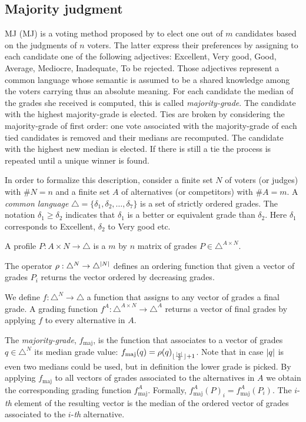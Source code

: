 \subsection*{Majority judgment}
	\label{sec:MJ}
	\acrlong{MJ} (\ac{MJ}) is a voting method proposed by \citet{Balinski2007,Balinski2011} to elect one out of $m$ candidates based on the judgments of $n$ voters. The latter express their preferences by assigning to each candidate one of the following adjectives: Excellent, Very good, Good, Average, Mediocre, Inadequate, To be rejected. Those adjectives represent a common language whose semantic is assumed to be a shared knowledge among the voters carrying thus an absolute meaning. For each candidate the median of the grades she received is computed, this is called \textit{majority-grade}. The candidate with the highest majority-grade is elected. Ties are broken by considering the majority-grade of first order: one vote associated with the majority-grade of each tied candidates is removed and their medians are recomputed. The candidate with the highest new median is elected. If there is still a tie the process is repeated until a unique winner is found.
	
	In order to formalize this description, consider a finite set $N$ of voters (or judges) with $\#N=n$ and a finite set $A$ of alternatives (or competitors) with $\#A=m$. 
	A \textit{common language} $\triangle = \{ \delta_1, \delta_2, \dots , \delta_7\}$ is a set of strictly ordered grades. The notation $\delta_1 \geq \delta_2$ indicates that $\delta_1$ is a better or equivalent grade than $\delta_2$. Here $\delta_1$ corresponds to Excellent, $\delta_2$ to Very good etc.
	
	A profile $P : A\times N \rightarrow \triangle$ is a $m$ by $n$ matrix of grades $P \in \triangle^{A \times N}$.
	
	The operator $\rho: \triangle^{N} \rightarrow \triangle^{\lvert N\rvert}$ defines an ordering function that given a vector of grades $P_i$ returns the vector ordered by decreasing grades.
	
	We define $f: \triangle^{N} \rightarrow \triangle$ a function that assigns to any vector of grades a final grade. A grading function $f^A: \triangle^{A \times N} \rightarrow \triangle^A$ returns a vector of final grades by applying $f$ to every alternative in $A$.
	
	The \emph{majority-grade}, $f_\text{maj}$, is the function that associates to a vector of grades $q \in \triangle^{N}$ its median grade value: $f_\text{maj}(q) = \rho(q)_{\lfloor\frac{\lvert q\rvert}{2}\rfloor + 1}$. Note that in case $\lvert q\rvert$ is even two medians could be used, but in \citet{Balinski2011} definition the lower grade is picked. By applying $f_\text{maj}$ to all vectors of grades associated to the alternatives in $A$ we obtain the corresponding grading function $f^A_\text{maj}$. Formally, $f^A_\text{maj}(P)_i = f^A_\text{maj}(P_i)$. The $i$-\emph{th} element of the resulting vector is the median of the ordered vector of grades associated to the $i$-\emph{th} alternative. 
	
